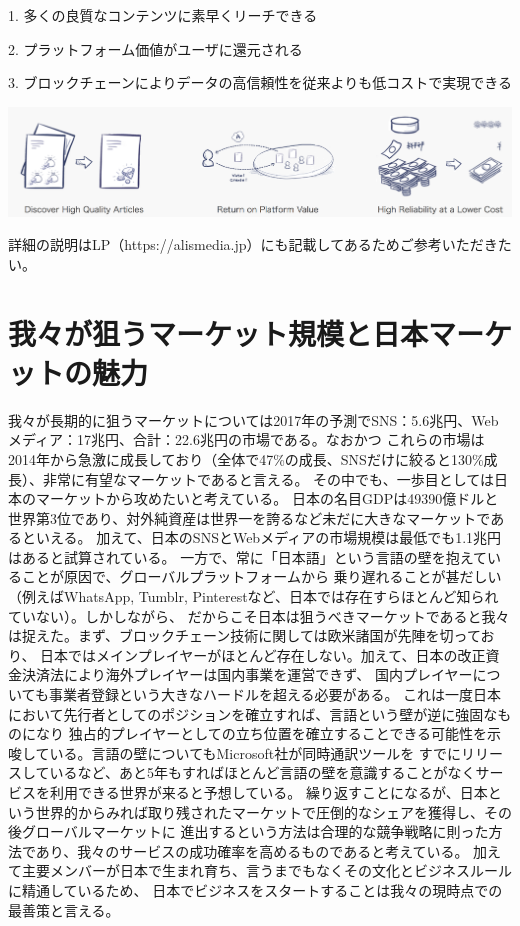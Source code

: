 \documentclass{jsarticle}
\begin{document}
1. 多くの良質なコンテンツに素早くリーチできる

2. プラットフォーム価値がユーザに還元される

3. ブロックチェーンによりデータの高信頼性を従来よりも低コストで実現できる

	\includegraphics[scale=0.4]{img/features.png}

詳細の説明はLP（https://alismedia.jp）にも記載してあるためご参考いただきたい。

\section{我々が狙うマーケット規模と日本マーケットの魅力}
我々が長期的に狙うマーケットについては2017年の予測でSNS：5.6兆円、Webメディア：17兆円、合計：22.6兆円の市場である。なおかつ
これらの市場は2014年から急激に成長しており（全体で47\%の成長、SNSだけに絞ると130\%成長）、非常に有望なマーケットであると言える。
その中でも、一歩目としては日本のマーケットから攻めたいと考えている。
日本の名目GDPは49390億ドルと世界第3位であり、対外純資産は世界一を誇るなど未だに大きなマーケットであるといえる。
加えて、日本のSNSとWebメディアの市場規模は最低でも1.1兆円はあると試算されている。
一方で、常に「日本語」という言語の壁を抱えていることが原因で、グローバルプラットフォームから
乗り遅れることが甚だしい（例えばWhatsApp, Tumblr, Pinterestなど、日本では存在すらほとんど知られていない）。しかしながら、
だからこそ日本は狙うべきマーケットであると我々は捉えた。まず、ブロックチェーン技術に関しては欧米諸国が先陣を切っており、
日本ではメインプレイヤーがほとんど存在しない。加えて、日本の改正資金決済法により海外プレイヤーは国内事業を運営できず、
国内プレイヤーについても事業者登録という大きなハードルを超える必要がある。
これは一度日本において先行者としてのポジションを確立すれば、言語という壁が逆に強固なものになり
独占的プレイヤーとしての立ち位置を確立することできる可能性を示唆している。言語の壁についてもMicrosoft社が同時通訳ツールを
すでにリリースしているなど、あと5年もすればほとんど言語の壁を意識することがなくサービスを利用できる世界が来ると予想している。
繰り返すことになるが、日本という世界的からみれば取り残されたマーケットで圧倒的なシェアを獲得し、その後グローバルマーケットに
進出するという方法は合理的な競争戦略に則った方法であり、我々のサービスの成功確率を高めるものであると考えている。
加えて主要メンバーが日本で生まれ育ち、言うまでもなくその文化とビジネスルールに精通しているため、
日本でビジネスをスタートすることは我々の現時点での最善策と言える。
\end{document}
